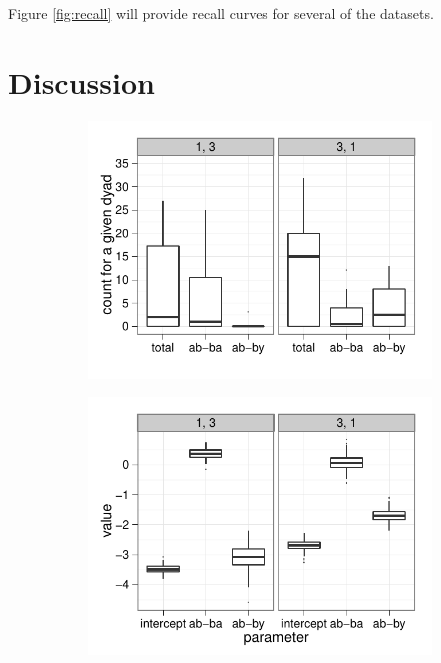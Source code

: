 \documentclass{article}
\begin{document}
Figure \ref{fig:recall} will provide recall curves for several of the datasets.

\section{Discussion}


\begin{figure}[t]
\begin{subfigure}[b]{0.5\textwidth}
\includegraphics[scale=.5]{../figs/eckmann-small/example-obs-stats}
\end{subfigure}
\qquad
\begin{subfigure}[b]{0.5\textwidth}
\includegraphics[scale=.5]{../figs/eckmann-small/example-estimates}
\end{subfigure}


\end{figure}
\end{document}
